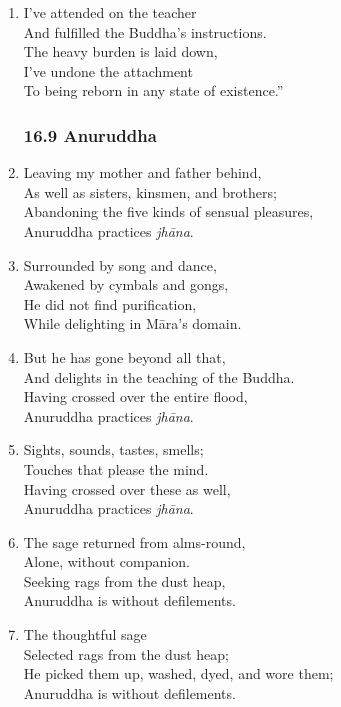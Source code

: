 \documentclass[10pt, openany]{book}
\begin{document}
\begin{enumerate}
\item I’ve attended on the teacher\\
And fulfilled the Buddha’s instructions.\\
The heavy burden is laid down,\\
I’ve undone the attachment \\
To being reborn in any state of existence.”

\subsubsection*{16.9 Anuruddha}

\item Leaving my mother and father behind,\\
As well as sisters, kinsmen, and brothers;\\
Abandoning the five kinds of sensual pleasures,\\
Anuruddha practices \emph{jhāna}.

\item Surrounded by song and dance,\\
Awakened by cymbals and gongs,\\
He did not find purification,\\
While delighting in Māra’s domain.

\item But he has gone beyond all that,\\
And delights in the teaching of the Buddha.\\
Having crossed over the entire flood,\\
Anuruddha practices \emph{jhāna}.

\item Sights, sounds, tastes, smells;\\
Touches that please the mind.\\
Having crossed over these as well,\\
Anuruddha practices \emph{jhāna}.

\item The sage returned from alms-round,\\
Alone, without companion.\\
Seeking rags from the dust heap,\\
Anuruddha is without defilements.

\item The thoughtful sage\\
Selected rags from the dust heap;\\
He picked them up, washed, dyed, and wore them;\\
Anuruddha is without defilements.


\end{enumerate}
\end{document}
